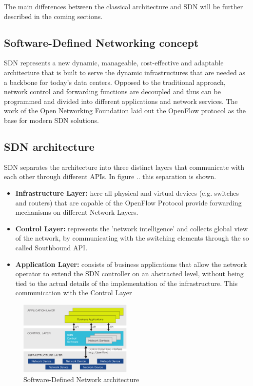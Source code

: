 The main differences between the classical architecture and SDN will be further described in the coming sections.

\subsection{Software-Defined Networking concept}


SDN represents a new dynamic, manageable, cost-effective and adaptable architecture that is built to serve the dynamic infrastructures that are needed as a backbone for today's data centers. Opposed to the traditional approach, network control and forwarding functions are decoupled and thus can be programmed and divided into different applications and network services.
The work of the Open Networking Foundation laid out the OpenFlow protocol as the base for modern SDN solutions.

\subsection{SDN architecture}

SDN separates the architecture into three distinct layers that communicate with each other through different APIs. In figure .. this separation is shown.

\begin{itemize}
\item \textbf{Infrastructure Layer:} here all physical and virtual devices (e.g. switches and routers) that are capable of the OpenFlow Protocol provide forwarding mechanisms on different Network Layers.
\item \textbf{Control Layer:} represents the 'network intelligence' and collects global view of the network, by communicating with the switching elements through the so called Southbound API.
\item \textbf{Application Layer:} consists of business applications that allow the network operator to extend the SDN controller on an abstracted level, without being tied to the actual details of the implementation of the infrastructure. This communication with the Control Layer


\end{itemize}

\begin{figure}[H]
\centering

\includegraphics[width=0.5\textwidth]{images/fundamentals/sdn_logical_architecture.png}

\caption{Software-Defined Network architecture}
\end{figure}

